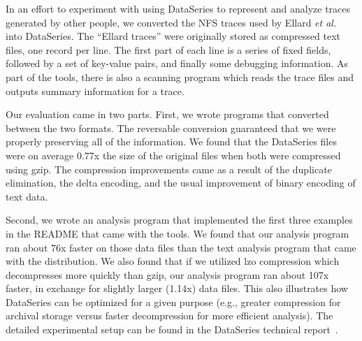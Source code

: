 \documentclass{acm_proc_article-sp}
\begin{document}
In an effort to experiment with using DataSeries to represent and
analyze traces generated by other people, we converted the NFS
traces used by Ellard \textit{et al.}~\cite{ellard03} into DataSeries.  
The ``Ellard traces''
were originally stored as compressed text files, one record per line.
The first part of each line is a series of fixed fields, followed by a
set of key-value pairs, and finally some debugging information.  As
part of the tools, there is also a scanning program which reads the
trace files and outputs summary information for a trace.

Our evaluation came in two parts.  First, we wrote programs that
converted between the two formats.  The reversable conversion
guaranteed that we were properly preserving all of the information.
We found that the DataSeries files were on average 0.77x the size of
the original files when both were compressed using gzip.  The
compression improvements came as a result of the duplicate
elimination, the delta encoding, and the usual improvement of binary
encoding of text data.

Second, we
wrote an analysis program that implemented the first three examples in
the README that came with the tools.  We found that our analysis
program ran about 76x faster on those data files than the text
analysis program that came with the distribution.  We also found that
if we utilized lzo compression which decompresses more quickly than
gzip, our analysis program ran about 107x faster, in exchange for
slightly larger (1.14x) data files.  This also illustrates how
DataSeries can be optimized for a given purpose (e.g., greater
compression for archival storage versus faster decompression for more
efficient analysis). The detailed experimental setup can be found in
the DataSeries technical report~\cite{DSTechnicalReportSnapshot}.
\end{document}

